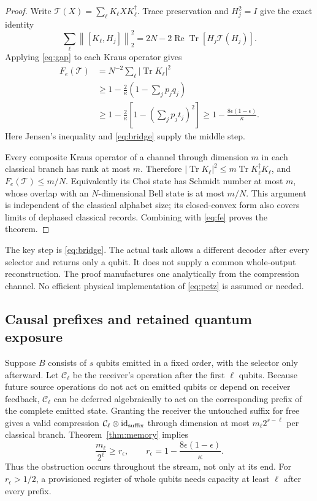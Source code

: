 \documentclass[11pt]{article}
\newcommand{\Tr}{\operatorname{Tr}}
\newcommand{\id}{\operatorname{id}}
\newcommand{\norm}[1]{\left\lVert#1\right\rVert}
\begin{document}
\begin{proof}
Write $\mathcal T(X)=\sum_\ell K_\ell X K_\ell^\dagger$. Trace preservation
and $H_j^2=I$ give the exact identity
\begin{equation}
 \sum_\ell\norm{[K_\ell,H_j]}_2^2
 =2N-2\operatorname{Re}\Tr[H_j\mathcal T(H_j)].
\end{equation}
Applying \eqref{eq:gap} to each Kraus operator gives
\begin{align}
 F_e(\mathcal T)
 &=N^{-2}\sum_\ell|\Tr K_\ell|^2\\
 &\ge1-\frac2\kappa\left(1-\sum_jp_jq_j\right)\\
 &\ge1-\frac2\kappa\left[1-\left(\sum_jp_jt_j\right)^2\right]
 \ge1-\frac{8\epsilon(1-\epsilon)}\kappa. \label{eq:fe}
\end{align}
Here Jensen's inequality and \eqref{eq:bridge} supply the middle step.

Every composite Kraus operator of a channel through dimension $m$ in each
classical branch has rank at most $m$. Therefore
$|\Tr K_\ell|^2\le m\Tr K_\ell^\dagger K_\ell$, and
$F_e(\mathcal T)\le m/N$. Equivalently its Choi state has Schmidt number at
most $m$, whose overlap with an $N$-dimensional Bell state is at most $m/N$.
This argument is independent of the classical alphabet size; its closed-convex
form also covers limits of dephased classical records. Combining with
\eqref{eq:fe} proves the theorem.
\end{proof}

The key step is \eqref{eq:bridge}. The actual task allows a different decoder
after every selector and returns only a qubit. It does not supply a common
whole-output reconstruction. The proof manufactures one analytically from
the compression channel. No efficient physical implementation of
\eqref{eq:petz} is assumed or needed.

\subsection{Causal prefixes and retained quantum exposure}\label{sec:prefix}
Suppose $B$ consists of $s$ qubits emitted in a fixed order, with the selector
only afterward. Let $\mathcal C_\ell$ be the receiver's operation after the
first $\ell$ qubits. Because future source operations do not act on emitted
qubits or depend on receiver feedback, $\mathcal C_\ell$ can be deferred
algebraically to act on the corresponding prefix of the complete emitted state.
Granting the receiver the untouched suffix for free gives a valid compression
$\mathcal C_\ell\otimes\id_{\rm suffix}$ through dimension at most
$m_\ell2^{s-\ell}$ per classical branch. Theorem~\ref{thm:memory} implies
\begin{equation}
 \frac{m_\ell}{2^\ell}\ge r_\epsilon,
 \qquad r_\epsilon=1-\frac{8\epsilon(1-\epsilon)}\kappa. \label{eq:prefix}
\end{equation}
Thus the obstruction occurs throughout the stream, not only at its end.
For $r_\epsilon>1/2$, a provisioned register of whole qubits needs capacity
at least $\ell$ after every prefix.
\end{document}
